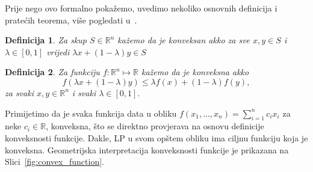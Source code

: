 \documentclass[a4paper, utf8, 11pt, colorlinks]{book}
\newtheorem{definition}{Definicija}
\begin{document}
Prije nego ovo formalno pokažemo, uvedimo nekoliko osnovnih definicija i pratećih teorema, više pogledati u~\cite{cite_key6}. 

\begin{definition}
  Za skup $S \in \mathbb{R}^n$ kažemo da je konveksan akko za sve $x,y\in S$ i $\lambda\in [0, 1]$ vrijedi $\lambda x + (1 - \lambda)y \in S$
\end{definition}
\begin{definition}
   Za funkciju $f:\mathbb{R}^n \mapsto \mathbb{R}$ kažemo da je konveksna akko 
   $$ f( \lambda x + (1-\lambda) y) \leq \lambda f(x) + (1 -\lambda) f(y),$$
   za svaki $x,y \in \mathbb{R}^n$ i svaki $\lambda \in [0,1].$
\end{definition}
Primijetimo da je svaka funkcija data u obliku $f(x_1, \ldots, x_n) = \sum_{i=1}^n c_i x_i$ za neke $c_i \in \mathbb{R}$, konveksna, što se direktno provjerava na osnovu definicije konveksnosti funkcije. Dakle, LP u svom opštem obliku  ima ciljnu funkciju koja je konveksna. Geometrijska interpretacija konveksnosti funkcije je prikazana na Slici~\ref{fig:convex_function}.
\end{document}
